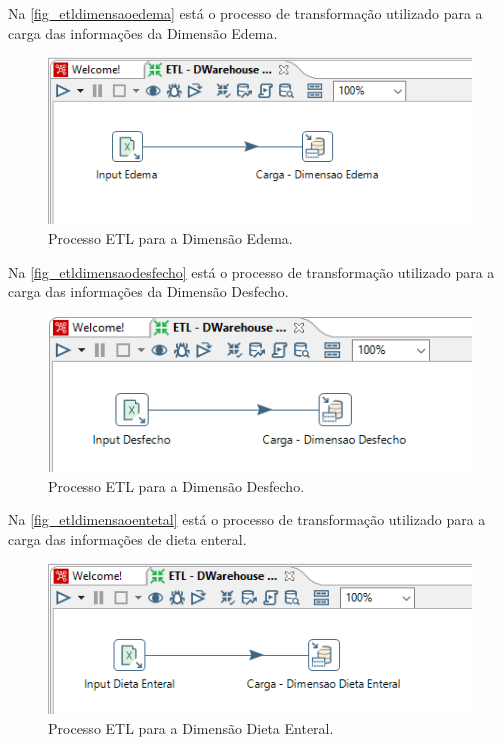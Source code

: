 Na \autoref{fig_etldimensaoedema} está o processo de transformação utilizado para a carga das informações da Dimensão Edema.
\begin{figure}[htb]
	\caption{\label{fig_etldimensaoedema}Processo ETL para a Dimensão Edema.}
	\begin{center}
	    \includegraphics[scale=0.7]{Imagens/figura - etl dw edema.png}
	\end{center}
\end{figure}

Na \autoref{fig_etldimensaodesfecho} está o processo de transformação utilizado para a carga das informações da Dimensão Desfecho.
\begin{figure}[htb]
	\caption{\label{fig_etldimensaodesfecho}Processo ETL para a Dimensão Desfecho.}
	\begin{center}
	    \includegraphics[scale=0.75]{Imagens/figura - etl dw desfecho.png}
	\end{center}
\end{figure}

Na \autoref{fig_etldimensaoentetal} está o processo de transformação utilizado para a carga das informações de dieta enteral.
\begin{figure}[htb]
	\caption{\label{fig_etldimensaoentetal}Processo ETL para a Dimensão Dieta Enteral.}
	\begin{center}
	    \includegraphics[scale=0.75]{Imagens/figura - etl dw dietaenteral.png}
	\end{center}
\end{figure}

